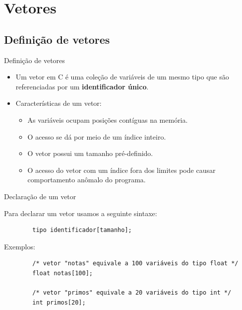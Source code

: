 \documentclass[handout]{beamer}
\begin{document}

\section{Vetores}


\subsection{Definição de vetores}

\begin{frame}{Definição de vetores}

    \begin{itemize}[<+->]
        \item Um vetor em C é uma coleção de variáveis de um mesmo tipo que são referenciadas por um {\bf identificador único}.
        \item Características de um vetor:
        \begin{itemize}
            \item As variáveis ocupam posições contíguas na memória.
            \item O acesso se dá por meio de um índice inteiro.
            \item O vetor possui um tamanho pré-definido.
            \item O acesso do vetor com um índice fora dos limites pode causar comportamento anômalo do programa.
        \end{itemize}
    \end{itemize}

\end{frame}

\begin{frame}[fragile]{Declaração de um vetor}

    Para declarar um vetor usamos a seguinte sintaxe:
    \begin{verbatim}
        tipo identificador[tamanho];
    \end{verbatim}

    Exemplos:
    \begin{verbatim}
        /* vetor "notas" equivale a 100 variáveis do tipo float */
        float notas[100];

        /* vetor "primos" equivale a 20 variáveis do tipo int */
        int primos[20];
    \end{verbatim}

\end{frame}
\end{document}
